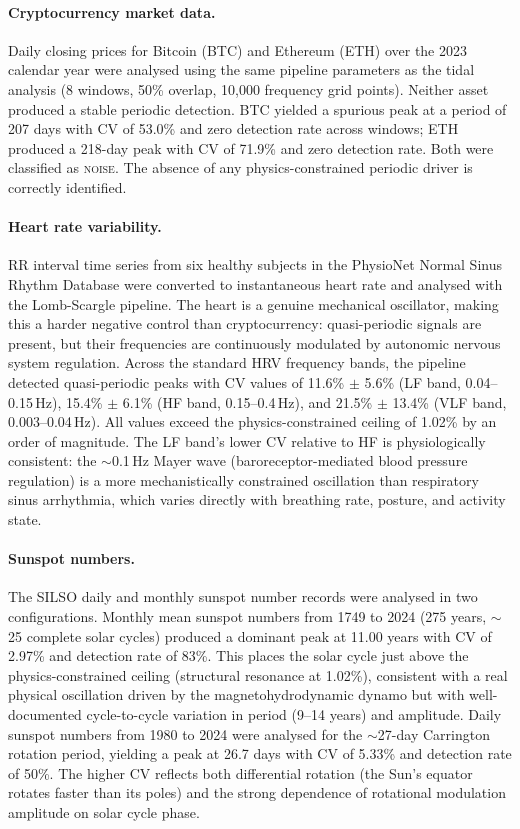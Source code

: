 \documentclass[11pt,a4paper]{article}
\begin{document}
\paragraph{Cryptocurrency market data.} Daily closing prices for Bitcoin (BTC) and Ethereum (ETH) over the 2023 calendar year were analysed using the same pipeline parameters as the tidal analysis (8 windows, 50\% overlap, 10{,}000 frequency grid points). Neither asset produced a stable periodic detection. BTC yielded a spurious peak at a period of 207 days with CV of 53.0\% and zero detection rate across windows; ETH produced a 218-day peak with CV of 71.9\% and zero detection rate. Both were classified as \textsc{noise}. The absence of any physics-constrained periodic driver is correctly identified.

\paragraph{Heart rate variability.} RR interval time series from six healthy subjects in the PhysioNet Normal Sinus Rhythm Database \citep{Goldberger2000} were converted to instantaneous heart rate and analysed with the Lomb-Scargle pipeline. The heart is a genuine mechanical oscillator, making this a harder negative control than cryptocurrency: quasi-periodic signals are present, but their frequencies are continuously modulated by autonomic nervous system regulation. Across the standard HRV frequency bands, the pipeline detected quasi-periodic peaks with CV values of 11.6\% $\pm$ 5.6\% (LF band, 0.04--0.15\,Hz), 15.4\% $\pm$ 6.1\% (HF band, 0.15--0.4\,Hz), and 21.5\% $\pm$ 13.4\% (VLF band, 0.003--0.04\,Hz). All values exceed the physics-constrained ceiling of 1.02\% by an order of magnitude. The LF band's lower CV relative to HF is physiologically consistent: the ${\sim}$0.1\,Hz Mayer wave (baroreceptor-mediated blood pressure regulation) is a more mechanistically constrained oscillation than respiratory sinus arrhythmia, which varies directly with breathing rate, posture, and activity state.

\paragraph{Sunspot numbers.} The SILSO daily and monthly sunspot number records \citep{Clette2014} were analysed in two configurations. Monthly mean sunspot numbers from 1749 to 2024 (275 years, ${\sim}$25 complete solar cycles) produced a dominant peak at 11.00 years with CV of 2.97\% and detection rate of 83\%. This places the solar cycle just above the physics-constrained ceiling (structural resonance at 1.02\%), consistent with a real physical oscillation driven by the magnetohydrodynamic dynamo but with well-documented cycle-to-cycle variation in period (9--14 years) and amplitude. Daily sunspot numbers from 1980 to 2024 were analysed for the ${\sim}$27-day Carrington rotation period, yielding a peak at 26.7 days with CV of 5.33\% and detection rate of 50\%. The higher CV reflects both differential rotation (the Sun's equator rotates faster than its poles) and the strong dependence of rotational modulation amplitude on solar cycle phase.
\end{document}
